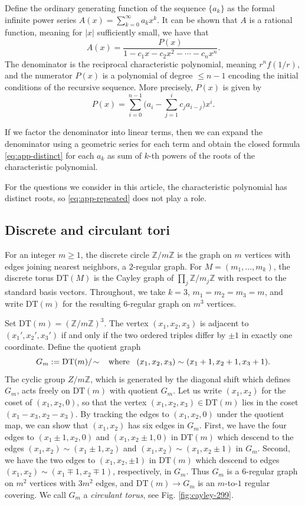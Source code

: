 \documentclass[11pt,reqno]{amsart}
\theoremstyle{remark}
\begin{document}
Define the ordinary generating function of the sequence $\{a_{k}\}$ as the formal infinite power
series $A(x)=\sum_{k=0}^\infty a_kx^k$.  It can be shown that $A$ is a  rational function,
meaning for $\vert x \vert$ sufficiently small, we have that
\begin{equation}
\label{eq:app-genfunc}
A(x) = \frac{P(x)}{1-c_1x-c_2x^2-\cdots-c_nx^n}.
\end{equation}
The denominator is the reciprocal characteristic polynomial, meaning $r^{n}f(1/r)$, and the
numerator $P(x)$ is a polynomial of degree $\le n-1$ encoding the
initial conditions of the recursive sequence.  More precisely, $P(x)$ is given by
\[
P(x) = \sum_{i=0}^{n-1}\Big(a_i-\sum_{j=1}^ic_ja_{i-j}\Big)x^i.
\]

If we factor the denominator into linear terms, then we can expand the denominator using a
geometric series for each term and obtain the closed formula \eqref{eq:app-distinct}
for each $a_{k}$ as sum of $k$-th powers of the roots
of the characteristic polynomial.

For the questions we consider in this article, the characteristic polynomial has distinct roots, so
\eqref{eq:app-repeated} does not play a role.

\subsection{Discrete and circulant tori}
For an integer $m\ge1$, the discrete circle $\mathbb Z/m\mathbb Z$ is the
graph on $m$ vertices with edges joining nearest neighbors, a $2$-regular
graph. For $M=(m_1,\dots,m_k)$, the discrete torus $\mathrm{DT}(M)$ is
the Cayley graph of $\prod_j\mathbb Z/m_j\mathbb Z$ with respect to the
standard basis vectors. Throughout, we take $k=3$, $m_1=m_2=m_3=m$, and
write $\mathrm{DT}(m)$ for the resulting $6$-regular graph on $m^3$
vertices.

Set $\mathrm{DT}(m)=(\mathbb Z/m\mathbb Z)^3$.  The vertex
$(x_1,x_2,x_3)$  is adjacent to $(x_1',x_2',x_3')$ if and only if
the two ordered triples differ by $\pm1$ in exactly one coordinate. Define the
quotient graph
$$
G_m := \mathrm{DT}(m)/\!\sim
\,\,\,\,\,
\text{\rm where}
\,\,\,\,\, (x_1,x_2,x_3)\sim(x_1+1,x_2+1,x_3+1).
$$
The cyclic group $Z/m\mathbb Z$, which is
generated by the diagonal shift which defines $G_{m}$,
acts freely on $\mathrm{DT}(m)$ with
quotient $G_m$.  Let us write $(x_1,x_2)$ for the coset of $(x_1,x_2,0)$, so
that the vertex $(x_1,x_2,x_3)\in\mathrm{DT}(m)$ lies in the coset
$(x_1-x_3,x_2-x_3)$. By tracking the edges to $(x_1,x_2,0)$ under the
quotient map, we can show that $(x_{1},x_{2})$ has six edges in $G_{m}$.
First, we have the four edges to $(x_1\pm1,x_2,0)$ and $(x_1,x_2\pm1,0)$ in $\mathrm{DT}(m)$
which descend to the edges $(x_1,x_2)\sim(x_1\pm1,x_2)$ and
$(x_1,x_2)\sim(x_1,x_2\pm1)$ in $G_m$.  Second, we have the two edges to
$(x_1,x_2,\pm1)$ in $\mathrm{DT}(m)$ which descend to edges $(x_1,x_2)\sim(x_1\mp 1,x_2\mp 1)$, respectively,
in $G_{m}$.
Thus $G_m$ is a $6$-regular graph on $m^2$ vertices
with $3m^2$ edges, and $\mathrm{DT}(m)\to G_m$ is an $m$-to-$1$ regular
covering. We call $G_m$ a \emph{circulant torus}, see Fig. \ref{fig:cayley-299}.
\end{document}
